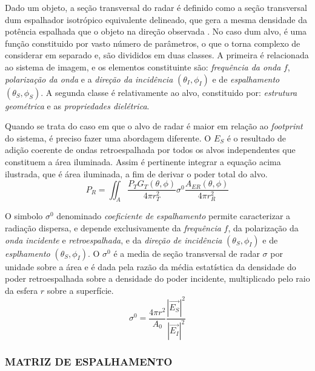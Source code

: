 \documentclass[a4paper,12pt]{article}
\begin{document}
Dado um objeto, a seção transversal do radar é definido como a seção transversal dum espalhador isotrópico equivalente delineado, que gera a mesma densidade da potência espalhada que o objeto na direção observada \cite{jong:2009}. No caso dum alvo, é uma função constituido por vasto número de parâmetros, o que o torna complexo de considerar em separado e, são divididos em duas classes. A primeira é relacionada ao sistema de imagem, e os elementos constituinte são: \textit{frequência da onda} $f$, \textit{polarização da onda} e a \textit{direção da incidência} $(\theta_{I}, \phi_{I})$ e de \textit{espalhamento} $(\theta_{S}, \phi_{S})$. A segunda classe é relativamente ao alvo, constituido por: \textit{estrutura geométrica} e as \textit{propriedades dielétrica}.

Quando se trata do caso em que o alvo de radar é maior em relação ao \textit{footprint} do sistema, é preciso fazer uma abordagem diferente. O $E_{S}$ é o resultado de adição coerente de ondas retroespalhada por todos os alvos independentes que constituem a área iluminada. Assim é pertinente integrar a equação acima ilustrada, que é área iluminada, a fim de derivar o poder total do alvo.
\begin{equation}
    P_{R}=\iint_A \frac{P_{T}G_{T}(\theta, \phi)}{4\pi r^2_{T}}\sigma^0\frac{A_{ER}(\theta, \phi)}{4\pi r^2_{R}}
\end{equation}

O simbolo $\sigma^0$ denominado \textit{coeficiente de espalhamento} permite caracterizar a radiação dispersa, e depende exclusivamente da \textit{frequência} $f$, da polarização da \textit{onda incidente} e \textit{retroespalhada}, e da \textit{direção de incidência} $(\theta_{S}, \phi_{I})$ e de \textit{esplhamento} $(\theta_{S}, \phi_{I})$. O $\sigma^0$ é a media de seção transversal de radar $\sigma$ por unidade sobre a área e é dada pela razão da média estatística da densidade do poder retroespalhada sobre a densidade do poder incidente, multiplicado pelo raio da esfera $r$ sobre a superfície.
\begin{equation}
    \sigma^0 = \frac{4\pi r^2}{A_{0}} \frac{|\vec{E_{S}}|^2}{|\vec{E_{I}}|^2}
\end{equation}

\subsubsection{MATRIZ DE ESPALHAMENTO}
\label{subsubsec:Mats}
\end{document}
